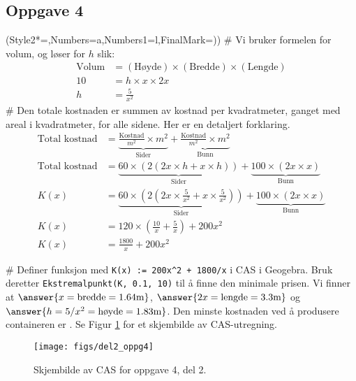 \subsection*{Oppgave 4}
\begin{easylist}[enumerate]
	\ListProperties(Style2*=,Numbers=a,Numbers1=l,FinalMark={)})
	# Vi bruker formelen for volum, og løser for $h$ slik:
	\begin{align*}
		\text{Volum} &= (\text{Høyde}) \times (\text{Bredde}) \times (\text{Lengde}) \\
		10 &= h  \times x \times 2x \\
		h &= \frac{5}{x^2}
	\end{align*}
	# Den totale kostnaden er summen av kostnad per kvadratmeter, ganget med areal i kvadratmeter, for alle sidene. Her er en detaljert forklaring.
	\begin{align*}
		\text{Total kostnad} &=  
		\underbrace{\frac{\text{Kostnad}}{m^2} \times m^2}_{\text{Sider}} + 
		\underbrace{\frac{\text{Kostnad}}{m^2} \times m^2}_{\text{Bunn}}
		\\
		\text{Total kostnad} &=  
		\underbrace{60 \times \left( 2(2x \times h + x \times h) \right)}_{\text{Sider}} + 
		\underbrace{100 \times \left( 2x \times x \right)}_{\text{Bunn}}
		\\
		K(x) &=  
		\underbrace{60 \times \left( 2\left(2x \times \frac{5}{x^2} + x \times \frac{5}{x^2}\right) \right)}_{\text{Sider}} + 
		\underbrace{100 \times \left( 2x \times x \right)}_{\text{Bunn}}
		\\
		K(x) &=  
		120 \times \left(  \frac{10}{x} +\frac{5}{x} \right) + 
		200x^2
		\\
		K(x) &=  \frac{1800}{x} + 
		200x^2
	\end{align*}
	
	# Definer funksjon med \verb|K(x) := 200x^2 + 1800/x| i CAS i Geogebra.
	Bruk deretter \verb|Ekstremalpunkt(K, 0.1, 10)| til å finne den minimale prisen. 
	Vi finner at $\answer{x = \text{bredde} = 1.64 \text{m}}$, 
	$\answer{2x = \text{lengde} = 3.3 \text{m}}$ og
	 $\answer{h = 5/x^2 = \text{høyde} = 1.83 \text{m}}$.
	 Den minste kostnaden ved å produsere containeren er
	 . Se Figur \ref{fig:del2_oppg4} for et skjembilde
	 av CAS-utregning.
	
\begin{figure}[ht!]
\centering
\texttt{[image: figs/del2\_oppg4]}
\caption{Skjembilde av CAS for oppgave 4, del 2.}
\label{fig:del2_oppg4}
\end{figure}
\end{easylist}


